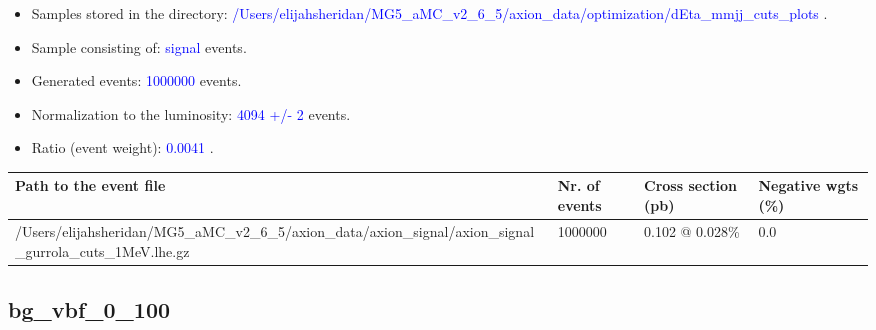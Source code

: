 \documentclass[a4paper, 10pt]{article}
\begin{document}
\begin{itemize}
  \item Samples stored in the directory: \textcolor{blue}{/\-Users/\-elijahsheridan/\-MG5\_aMC\_v2\_6\_5/\-axion\_data/\-optimization/\-dEta\_mmjj\_cuts\_plots} .
   \item Sample consisting of: \textcolor{blue}{signal}  events.
   \item Generated events: \textcolor{blue}{1000000 }  events.
   \item Normalization to the luminosity: \textcolor{blue}{4094}\textcolor{blue}{ +/\-- }\textcolor{blue}{2 }  events.
   \item Ratio (event weight): \textcolor{blue}{0.0041 } .  
 
\end{itemize}
\begin{table}[H]
  \begin{center}
    \begin{tabular}{|m{55.0mm}|m{25.0mm}|m{30.0mm}|m{30.0mm}|}
      \hline
      {\cellcolor{yellow}         Path to the event file}& {\cellcolor{yellow}         Nr. of events}& {\cellcolor{yellow}         Cross section (pb)}& {\cellcolor{yellow}         Negative wgts (\%)}\\
      \hline
      {\cellcolor{white}          /\-Users/\-elijahsheridan/\-MG5\_aMC\_v2\_6\_5/\-axion\_data/\-axion\_signal/\-axion\_signal\_gurrola\_cuts\_1MeV.lhe.gz}& {\cellcolor{white}          1000000}& {\cellcolor{white}          0.102 @ 0.028\%}& {\cellcolor{white}          0.0}\\
\hline
    \end{tabular}
  \end{center}
\end{table}

\subsection{ bg\_vbf\_0\_100}
\end{document}

